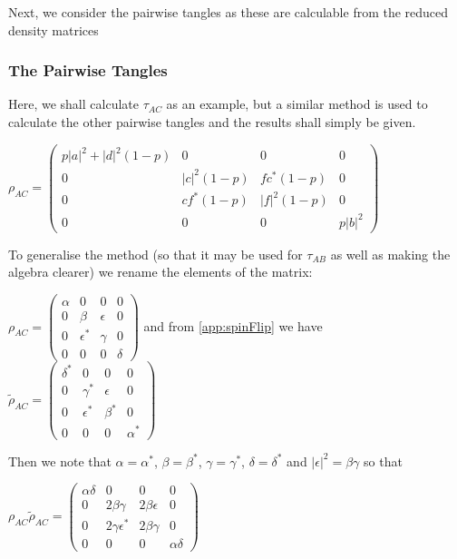 \documentclass[12pt,a4paper]{article}
\numberwithin{equation}{section}
\begin{document}
\vskip 2mm

Next, we consider the pairwise tangles as these are calculable from the reduced density matrices

\newpage

\subsubsection{The Pairwise Tangles}
\label{subsubsec:fourPairwise}

Here, we shall calculate $\tau_{AC}$ as an example, but a similar method is used to calculate the other pairwise tangles and the results shall simply be given.

$\rho_{AC} = \begin{pmatrix} p|a|^2+|d|^2(1-p) & 0 & 0 & 0 \\ 0 & |c|^2(1-p) & fc^*(1-p) & 0 \\ 0 & cf^*(1-p) & |f|^2(1-p) & 0 \\ 0 & 0 & 0 & p|b|^2 \end{pmatrix}$

To generalise the method (so that it may be used for $\tau_{AB}$ as well as making the algebra clearer) we rename the elements of the matrix:

\begin{center}
$\rho_{AC} = \begin{pmatrix} \alpha & 0 & 0 & 0 \\ 0 & \beta & \epsilon & 0 \\ 0 & \epsilon^* & \gamma & 0 \\ 0 & 0 & 0 & \delta \end{pmatrix}$ and from \ref{app:spinFlip} we have $\tilde{\rho}_{AC} = \begin{pmatrix} \delta^* & 0 & 0 & 0 \\ 0 & \gamma^* & \epsilon & 0 \\ 0 & \epsilon^* & \beta^* & 0 \\ 0 & 0 & 0 & \alpha^* \end{pmatrix}$
\end{center}

Then we note that $\alpha = \alpha^*$, $\beta = \beta^*$, $\gamma = \gamma^*$, $\delta = \delta^*$ and $|\epsilon|^2 = \beta\gamma$ so that

\begin{center}
$\rho_{AC}\tilde{\rho}_{AC} = \begin{pmatrix} \alpha\delta & 0 & 0 & 0 \\ 0 & 2\beta\gamma & 2\beta\epsilon & 0 \\ 0 & 2\gamma\epsilon^* & 2\beta\gamma & 0 \\ 0 & 0 & 0 & \alpha\delta \end{pmatrix}$
\end{center}
\end{document}

